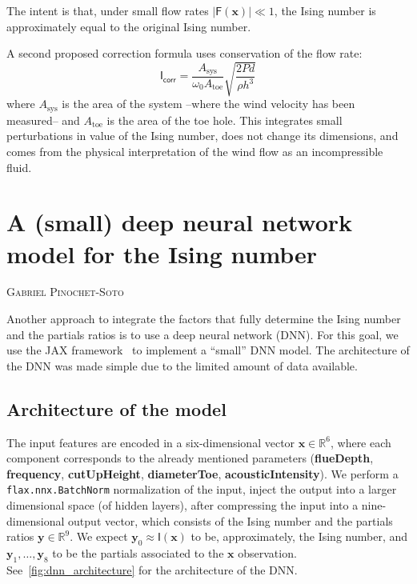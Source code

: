 \documentclass{psu-report}
\newcommand{\chapterauthor}[1]{%
  \vspace{-2em}
  {\large \textsc{#1}\par}
  \vspace{1.5em}
}
\begin{document}
The intent is that, under small flow rates \(|\mathsf{F}(\mathbf{x})| \ll 1\),
the Ising number is approximately equal to the original Ising number.

A second proposed correction formula uses conservation of the flow rate:
\begin{equation}
    \label{eq:ising_correction2}
    \mathsf{I}_\mathsf{corr} = 
    \frac{A_{\mathrm{sys}}}{\omega_0 A_{\mathrm{toe}}}\sqrt{\frac{2 P d}{\rho h^3}}
\end{equation}
where \(A_{\mathrm{sys}}\) is the area of the system --where the wind velocity
has been measured-- and \(A_{\mathrm{toe}}\) is the area of the toe hole.
This integrates small perturbations in value of the Ising number, does not
change its dimensions, and comes from the physical interpretation of the
wind flow as an incompressible fluid.



\chapter[DNN model for Ising number]{A (small) deep neural network model for the Ising number}
\chapterauthor{Gabriel Pinochet-Soto}

Another approach to integrate the factors that fully determine the Ising number
and the partials ratios is to use a deep neural network (DNN).
For this goal, we use the JAX framework~\autocite{2018Jax-1, 2020Optax-1,
2024Flax-1} to implement a ``small'' DNN model.
The architecture of the DNN was made simple due to the limited amount of data
available.

\section{Architecture of the model}

The input features are encoded in a six-dimensional vector
\(\mathbf{x} \in \mathbb{R}^6\), where each component corresponds to the
already mentioned parameters (\textbf{flueDepth}, \textbf{frequency},
\textbf{cutUpHeight}, \textbf{diameterToe}, \textbf{acousticIntensity}).
We perform a \texttt{flax.nnx.BatchNorm} normalization of the input,
inject the output into a larger dimensional space (of hidden layers),
after compressing the input into a nine-dimensional output vector,
which consists of the Ising number and the partials ratios
\(\mathbf{y} \in \mathbb{R}^9\).
We expect \(\mathbf{y}_0 \approx \mathsf{I}(\mathbf{x})\) to be, approximately,
the Ising number, and \(\mathbf{y}_1, \ldots, \mathbf{y}_8\) to be the partials
associated to the \(\mathbf{x}\) observation.
See~\autoref{fig:dnn_architecture} for the architecture of the DNN.
\end{document}
